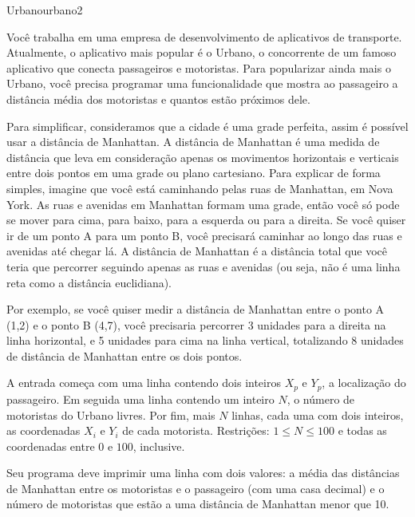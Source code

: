 \documentclass[12pt,a4paper,oneside]{article}
\begin{document}
\begin{problem}{Urbano}{urbano}{2}

Você trabalha em uma empresa de desenvolvimento de aplicativos de transporte. Atualmente, o aplicativo mais popular é o Urbano, o concorrente de um famoso aplicativo que conecta passageiros e motoristas. Para popularizar ainda mais o Urbano, você precisa programar uma funcionalidade que mostra ao passageiro a distância média dos motoristas e quantos estão próximos dele.

Para simplificar, consideramos que a cidade é uma grade perfeita, assim é possível usar a distância de Manhattan. A distância de Manhattan é uma medida de distância que leva em consideração apenas os movimentos horizontais e verticais entre dois pontos em uma grade ou plano cartesiano. Para explicar de forma simples, imagine que você está caminhando pelas ruas de Manhattan, em Nova York. As ruas e avenidas em Manhattan formam uma grade, então você só pode se mover para cima, para baixo, para a esquerda ou para a direita. Se você quiser ir de um ponto A para um ponto B, você precisará caminhar ao longo das ruas e avenidas até chegar lá. A distância de Manhattan é a distância total que você teria que percorrer seguindo apenas as ruas e avenidas (ou seja, não é uma linha reta como a distância euclidiana).

Por exemplo, se você quiser medir a distância de Manhattan entre o ponto A (1,2) e o ponto B (4,7), você precisaria percorrer 3 unidades para a direita na linha horizontal, e 5 unidades para cima na linha vertical, totalizando 8 unidades de distância de Manhattan entre os dois pontos.

%

\InputFile

A entrada começa com uma linha contendo dois inteiros $X_p$ e $Y_p$, a localização do passageiro. Em seguida uma linha contendo um inteiro $N$, o número de motoristas do Urbano livres. Por fim, mais $N$ linhas, cada uma com dois inteiros, as coordenadas $X_i$ e $Y_i$ de cada motorista. Restrições:  $1 \leq N \leq 100$ e todas as coordenadas entre $0$ e $100$, inclusive.


\OutputFile

Seu programa deve imprimir uma linha com dois valores: a média das distâncias de Manhattan entre os motoristas e o passageiro (com uma casa decimal) e o número de motoristas que estão a uma distância de Manhattan menor que 10.



\end{problem}
\end{document}
